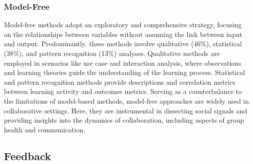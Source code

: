 \documentclass[manuscript,screen,review]{acmart}
\begin{document}


\subsubsection{Model-Free}

Model-free methods adopt an exploratory and comprehensive strategy, focusing on the relationships between variables without assuming the link between input and output. Predominantly, these methods involve qualitative (46\%), statistical (38\%), and pattern recognition (13\%) analyses. Qualitative methods are employed in scenarios like use case and interaction analysis, where observations and learning theories guide the understanding of the learning process. Statistical and pattern recognition methods provide descriptions and correlation metrics between learning activity and outcomes metrics. Serving as a counterbalance to the limitations of model-based methods, model-free approaches are widely used in collaborative settings. Here, they are instrumental in dissecting social signals and providing insights into the dynamics of collaboration, including aspects of group health and communication.




\subsection{Feedback}\label{subsec:feedback}
\end{document}
